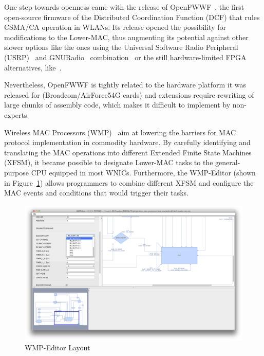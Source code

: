 One step towards openness came with the release of OpenFWWF~\cite{OpenFWWF}, the first open-source firmware of the Distributed Coordination Function (DCF) that rules CSMA/CA operation in WLANs. Its release opened the possibility for modifications to the Lower-MAC, thus augmenting its potential against other slower options like the ones using the Universal Software Radio Peripheral (USRP)~\cite{ettus2008universal} and GNURadio~\cite{blossom2004gnu} combination~\cite{tan2011sora} or the still hardware-limited FPGA alternatives, like~\cite{ng2010airblue}.

Nevertheless, OpenFWWF is tightly related to the hardware platform it was released for (Broadcom/AirForce54G cards) and extensions require rewriting of large chunks of assembly code, which makes it difficult to implement by non-experts.

Wireless MAC Processors (WMP)~\cite{WMP} aim at lowering the barriers for MAC protocol implementation in commodity hardware. By carefully identifying and translating the MAC operations into different Extended Finite State Machines (XFSM), it became possible to designate Lower-MAC tasks to the general-purpose CPU equipped in most WNICs. Furthermore, the WMP-Editor (shown in Figure~\ref{fig:WMPEditor}) allows programmers to combine different XFSM and configure the MAC events and conditions that would trigger their tasks.


\begin{figure}[htbp]
  \centering
  \includegraphics[width=\linewidth]{WMP-EditorLayout.eps}
  \caption{WMP-Editor Layout
  \label{fig:WMPEditor}}
\end{figure}